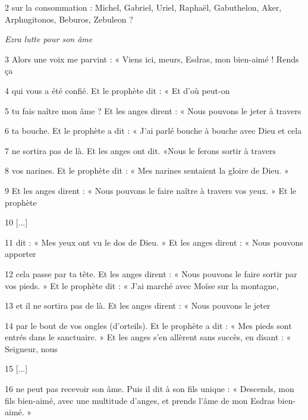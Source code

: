 \par 2 sur la consommation : Michel, Gabriel, Uriel, Raphaël, Gabuthelon, Aker, Arphugitonos, Beburos, Zebuleon ?

\par \textit{Ezra lutte pour son âme}

\par 3 Alors une voix me parvint : « Viens ici, meurs, Esdras, mon bien-aimé ! Rends ça

\par 4 qui vous a été confié. Et le prophète dit : « Et d’où peut-on

\par 5 tu fais naître mon âme ? Et les anges dirent : « Nous pouvons le jeter à travers

\par 6 ta bouche. Et le prophète a dit : « J’ai parlé bouche à bouche avec Dieu et cela

\par 7 ne sortira pas de là. Et les anges ont dit. «Nous le ferons sortir à travers

\par 8 vos narines. Et le prophète dit : « Mes narines sentaient la gloire de Dieu. »

\par 9 Et les anges dirent : « Nous pouvons le faire naître à travers vos yeux. » Et le prophète

\par 10 [...]

\par 11 dit : « Mes yeux ont vu le dos de Dieu. » Et les anges dirent : « Nous pouvons apporter

\par 12 cela passe par ta tête. Et les anges dirent : « Nous pouvons le faire sortir par vos pieds. » Et le prophète dit : « J’ai marché avec Moïse sur la montagne,

\par 13 et il ne sortira pas de là. Et les anges dirent : « Nous pouvons le jeter

\par 14 par le bout de vos ongles (d'orteils). Et le prophète a dit : « Mes pieds sont entrés dans le sanctuaire. » Et les anges s'en allèrent sans succès, en disant : « Seigneur, nous

\par 15 [...]

\par 16 ne peut pas recevoir son âme. Puis il dit à son fils unique : « Descends, mon fils bien-aimé, avec une multitude d'anges, et prends l'âme de mon Esdras bien-aimé. »

